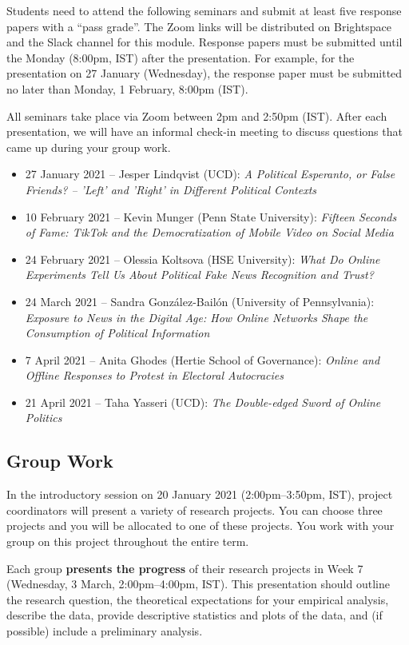\documentclass[abstract=on,parskip=full,headings=standardclasses,fontsize=11pt,paper=a4]{scrartcl}
\begin{document}
 
Students need to attend the following seminars and submit at least five response papers with a ``pass grade''. The Zoom links will be distributed on Brightspace and the Slack channel for this module.  Response papers must be submitted until the Monday (8:00pm, IST) after the presentation. For example, for the presentation on 27 January (Wednesday), the response paper must be submitted no later than Monday, 1 February, 8:00pm (IST).


All seminars take place via Zoom between 2pm and 2:50pm (IST). After each presentation, we will have an informal check-in meeting to discuss questions that came up during your group work.

\begin{itemize}
\item 27 January 2021 -- Jesper Lindqvist (UCD): \textit{A Political Esperanto, or False Friends? – 'Left' and 'Right' in Different Political Contexts}
\item 10 February 2021 -- Kevin Munger (Penn State University): \textit{Fifteen Seconds of Fame: TikTok and the Democratization of Mobile Video on Social Media}
\item 24 February 2021 -- Olessia Koltsova (HSE University): \textit{What Do Online Experiments Tell Us About Political Fake News Recognition and Trust?}
\item 24 March 2021 -- Sandra González-Bailón (University of Pennsylvania): \textit{Exposure to News in the Digital Age: How Online Networks Shape the Consumption of Political Information}
\item 7 April 2021 -- Anita Ghodes (Hertie School of Governance): \textit{Online and Offline Responses to Protest in Electoral Autocracies}
\item 21 April 2021 -- Taha Yasseri (UCD): \textit{The Double-edged Sword of Online Politics}
\end{itemize}


\subsection*{Group Work}

In the introductory session on 20 January 2021 (2:00pm--3:50pm, IST), project coordinators will present a variety of research projects. You can choose three projects and you will be allocated to one of these projects. You work with your group on this project throughout the entire term. 

Each group \textbf{presents the progress} of their research projects in Week 7 (Wednesday, 3 March, 2:00pm--4:00pm, IST). This presentation should outline the research question, the theoretical expectations for your empirical analysis, describe the data, provide descriptive statistics and plots of the data, and (if possible) include a preliminary analysis. 
\end{document}
